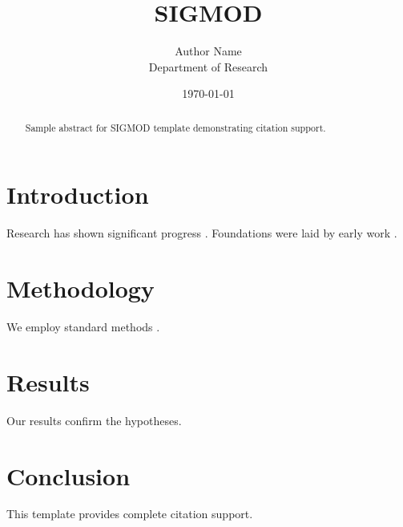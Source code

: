 \documentclass{article}
\title{SIGMOD}
\author{Author Name \\ \small Department of Research}
\date{\today}
\begin{document}
\maketitle

\begin{abstract}
Sample abstract for SIGMOD template demonstrating citation support.
\end{abstract}

\section{Introduction}
Research has shown significant progress \citep{einstein1905}. Foundations were laid by early work \citep{turing1950}.

\section{Methodology}
We employ standard methods \citep{knuth1984}.

\section{Results}
Our results confirm the hypotheses.

\section{Conclusion}
This template provides complete citation support.



\end{document}
